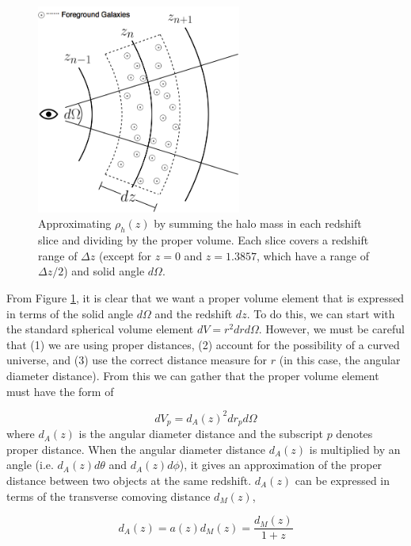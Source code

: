 \documentclass[12pt]{article}
\begin{document}
\begin{figure}[!ht]
  \centering
  \includegraphics[width=0.6\textwidth]{figs-swe/comoving_integral.png}
  \caption{Approximating $\rho_h(z)$ by summing the halo mass in each redshift slice and dividing by the proper volume. Each slice covers a redshift range of $\Delta z$ (except for $z=0$ and $z=1.3857$, which have a range of $\Delta z/2$) and solid angle $d\Omega$.}
  \label{rho_slice}
\end{figure}

From Figure \ref{rho_slice}, it is clear that we want a proper volume element that is expressed in terms of the solid angle $d\Omega$ and the redshift $dz$. To do this, we can start with the standard spherical volume element $dV=r^2drd\Omega$. However, we must be careful that (1) we are using proper distances, (2) account for the possibility of a curved universe, and (3) use the correct distance measure for $r$ (in this case, the angular diameter distance). From this we can gather that the proper volume element must have the form of

\begin{equation}\label{proper_element}
dV_p=d_A(z)^2dr_pd\Omega
\end{equation}
where $d_A(z)$ is the angular diameter distance and the subscript $p$ denotes proper distance. When the angular diameter distance $d_A(z)$ is multiplied by an angle (i.e. $d_A(z)d\theta$ and $d_A(z)d\phi$), it gives an approximation of the proper distance between two objects at the same redshift. $d_A(z)$ can be expressed in terms of the transverse comoving distance $d_M(z)$,

\begin{equation}\label{angular2transverse}
d_A(z)=a(z)d_M(z)=\frac{d_M(z)}{1+z}
\end{equation}
\end{document}
